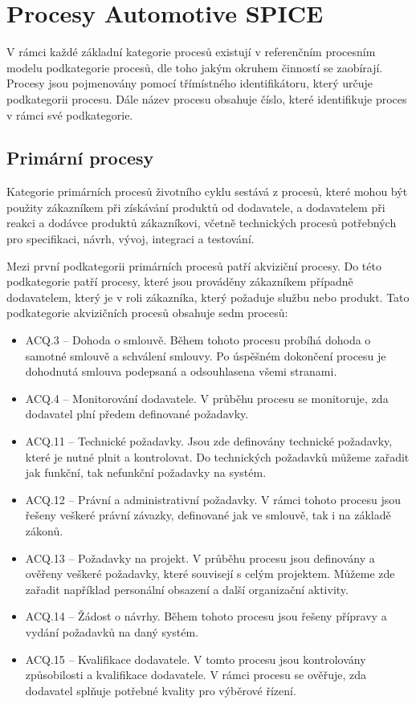 \documentclass[czech,master]{diploma}
\begin{document}

\section{Procesy Automotive SPICE}
\label{sec:aspice_processes}
V rámci každé základní kategorie procesů existují v referenčním procesním modelu podkategorie procesů, dle toho jakým okruhem činností se zaobírají. Procesy jsou pojmenovány pomocí třímístného identifikátoru, který určuje podkategorii procesu. Dále název procesu obsahuje číslo, které identifikuje proces v rámci své podkategorie.

\subsection{Primární procesy}
Kategorie primárních procesů životního cyklu sestává z procesů, které mohou být použity zákazníkem při získávání produktů od dodavatele, a dodavatelem při reakci a dodávce produktů zákazníkovi, včetně technických procesů potřebných pro specifikaci, návrh, vývoj, integraci a testování.

Mezi první podkategorii primárních procesů patří akviziční procesy. Do této podkategorie patří procesy, které jsou prováděny zákazníkem případně dodavatelem, který je v roli zákazníka, který požaduje  službu nebo produkt. Tato podkategorie akvizičních procesů obsahuje sedm procesů:

\begin{itemize}
	\item ACQ.3 -- Dohoda o smlouvě. Během tohoto procesu probíhá dohoda o samotné smlouvě a schválení smlouvy. Po úspěšném dokončení procesu je dohodnutá smlouva podepsaná a odsouhlasena všemi stranami.
	\item ACQ.4 -- Monitorování dodavatele. V průběhu procesu se monitoruje, zda dodavatel plní předem definované požadavky.
	\item ACQ.11 -- Technické požadavky. Jsou zde definovány technické požadavky, které je nutné plnit a kontrolovat. Do technických požadavků můžeme zařadit jak funkční, tak nefunkční požadavky na systém.
	\item ACQ.12 -- Právní a administrativní požadavky. V rámci tohoto procesu jsou řešeny veškeré právní závazky, definované jak ve smlouvě, tak i  na základě zákonů.
	\item ACQ.13 -- Požadavky na projekt. V průběhu procesu jsou definovány a ověřeny veškeré požadavky, které souvisejí s celým projektem. Můžeme zde zařadit například personální obsazení a další organizační aktivity.
	\item ACQ.14 -- Žádost o návrhy.  Během tohoto procesu jsou řešeny přípravy a vydání požadavků na daný systém.
	\item ACQ.15 -- Kvalifikace dodavatele. V tomto procesu jsou kontrolovány způsobilosti a kvalifikace dodavatele. V rámci procesu se ověřuje, zda dodavatel splňuje potřebné kvality pro výběrové řízení.
\end{itemize}
\end{document}
